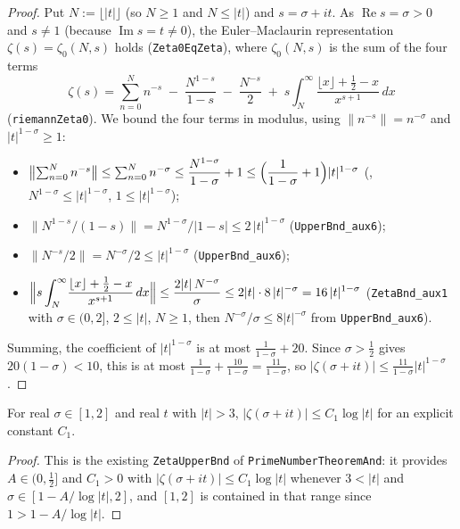 \begin{proof}
\leanok
{}
Put $N:=\lfloor|t|\rfloor$ (so $N\ge1$ and $N\le|t|$) and
$s=\sigma+it$. As $\operatorname{Re}s=\sigma>0$ and $s\ne1$ (because
$\operatorname{Im}s=t\ne0$), the Euler--Maclaurin representation
$\zeta(s)=\zeta_0(N,s)$ holds (\texttt{Zeta0EqZeta}), where $\zeta_0(N,s)$ is the sum
of the four terms
\[
  \zeta(s)=\sum_{n=0}^{N} n^{-s}
  \;-\;\frac{N^{1-s}}{1-s}\;-\;\frac{N^{-s}}{2}
  \;+\;s\!\int_N^\infty\!\frac{\lfloor x\rfloor+\tfrac12-x}{x^{s+1}}\,dx
\]
(\texttt{riemannZeta0}). We bound the four terms in modulus, using
$\|n^{-s}\|=n^{-\sigma}$ and $|t|^{1-\sigma}\ge1$:
\begin{itemize}
  \item $\bigl\|\sum_{n=0}^{N} n^{-s}\bigr\|\le\sum_{n=0}^{N} n^{-\sigma}
        \le \dfrac{N^{1-\sigma}}{1-\sigma}+1
        \le \Bigl(\dfrac1{1-\sigma}+1\Bigr)|t|^{1-\sigma}$
        \quad(, $N^{1-\sigma}\le|t|^{1-\sigma}$, $1\le|t|^{1-\sigma}$);
  \item $\bigl\|N^{1-s}/(1-s)\bigr\|=N^{1-\sigma}/|1-s|\le2\,|t|^{1-\sigma}$
        \quad(\texttt{UpperBnd\_aux6});
  \item $\|N^{-s}/2\|=N^{-\sigma}/2\le|t|^{1-\sigma}$ \quad(\texttt{UpperBnd\_aux6});
  \item $\Bigl\|s\displaystyle\int_N^\infty\!\frac{\lfloor x\rfloor+\tfrac12-x}{x^{s+1}}\,dx\Bigr\|
        \le \dfrac{2|t|\,N^{-\sigma}}{\sigma}
        \le 2|t|\cdot 8\,|t|^{-\sigma}
        = 16\,|t|^{1-\sigma}$
        \quad(\texttt{ZetaBnd\_aux1} with $\sigma\in(0,2]$, $2\le|t|$, $N\ge1$, then
        $N^{-\sigma}/\sigma\le8|t|^{-\sigma}$ from \texttt{UpperBnd\_aux6}).
\end{itemize}
Summing, the coefficient of $|t|^{1-\sigma}$ is at most
$\frac1{1-\sigma}+20$. Since $\sigma>\tfrac12$ gives $20(1-\sigma)<10$, this is at most
$\frac{1}{1-\sigma}+\frac{10}{1-\sigma}=\frac{11}{1-\sigma}$,
so $|\zeta(\sigma+it)|\le\frac{11}{1-\sigma}|t|^{1-\sigma}$.
\end{proof}

\begin{lemma}[Bound near $\sigma=1$]
\label{lem:lb_zeta_near_one}
\leanok
For real $\sigma\in[1,2]$ and real $t$ with $|t|>3$,
$|\zeta(\sigma+it)|\le C_1\log|t|$ for an explicit constant $C_1$.
\end{lemma}

\begin{proof}
\leanok
This is the existing \texttt{ZetaUpperBnd} of \texttt{PrimeNumberTheoremAnd}: it
provides $A\in(0,\tfrac12]$ and $C_1>0$ with $|\zeta(\sigma+it)|\le C_1\log|t|$
whenever $3<|t|$ and $\sigma\in[1-A/\log|t|,2]$, and $[1,2]$ is contained in that
range since $1>1-A/\log|t|$.
\end{proof}

